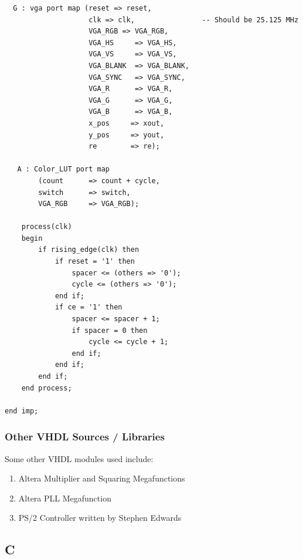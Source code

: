 \documentclass{article}
\begin{document}
\begin{lstlisting}
  G : vga port map (reset => reset,
					clk => clk,                -- Should be 25.125 MHz
					VGA_RGB => VGA_RGB,
					VGA_HS     => VGA_HS,
					VGA_VS     => VGA_VS,
					VGA_BLANK  => VGA_BLANK,
					VGA_SYNC   => VGA_SYNC,
					VGA_R      => VGA_R,
					VGA_G      => VGA_G,
					VGA_B      => VGA_B,
					x_pos	  => xout,
					y_pos	  => yout,
					re		  => re);

   A : Color_LUT port map 
		(count		=> count + cycle,
		switch		=> switch,
		VGA_RGB		=> VGA_RGB);

	process(clk)
	begin
		if rising_edge(clk) then
			if reset = '1' then
				spacer <= (others => '0');
				cycle <= (others => '0');
			end if;
			if ce = '1' then
				spacer <= spacer + 1;
				if spacer = 0 then
					cycle <= cycle + 1;
				end if;
			end if;
		end if;
	end process;

end imp;
\end{lstlisting}
\subsubsection{Other VHDL Sources / Libraries}
Some other VHDL modules used include:
\begin{enumerate}{}
\item Altera Multiplier and Squaring Megafunctions
\item Altera PLL Megafunction
\item PS/2 Controller written by Stephen Edwards
\end{enumerate}

\subsection{C}
\end{document}
